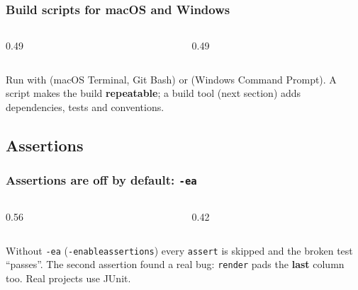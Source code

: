\documentclass[aspectratio=169,10pt,compress]{beamer}
\begin{document}
\begin{frame}[t,fragile] \frametitle{Build scripts for macOS and Windows}
  \begin{columns}[T]
    \begin{column}{0.49\textwidth}
    \end{column}
    \begin{column}{0.49\textwidth}
    \end{column}
  \end{columns}
  \small Run with  (macOS Terminal, Git Bash) or  (Windows Command Prompt).
  A script makes the build \textbf{repeatable}; a build tool (next section) adds dependencies, tests and conventions.
\end{frame}


\subsection[Assertions]{Assertions}




\begin{frame}[t,fragile] \frametitle{Assertions are off by default: \texttt{-ea}}
  \begin{columns}[T]
    \begin{column}{0.56\textwidth}
    \end{column}
    \begin{column}{0.42\textwidth}
    \end{column}
  \end{columns}

  \vspace{0.1em}
  \small Without \texttt{-ea} (\texttt{-enableassertions}) every \texttt{assert} is skipped and the broken test ``passes''.
  The second assertion found a real bug: \texttt{render} pads the \textbf{last} column too. Real projects use JUnit.
\end{frame}
\end{document}
